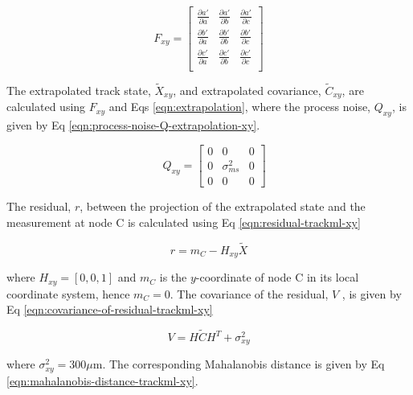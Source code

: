 \begin{equation}
F_{xy} = \begin{bmatrix} 
        \frac{\partial a'}{\partial a} & \frac{\partial a'}{\partial b} & \frac{\partial a'}{\partial c} \\ 
        
        \frac{\partial b'}{\partial a} & \frac{\partial b'}{\partial b} & \frac{\partial b'}{\partial c} \\
        
        \frac{\partial c'}{\partial a} & \frac{\partial c'}{\partial b} & \frac{\partial c'}{\partial c} \\
        \end{bmatrix} 
\label{eqn:transition-jacobian-F-kf-extrapolation-xy}
\end{equation}


The extrapolated track state, $\tilde{X}_{xy}$, and extrapolated covariance, $\tilde{C}_{xy}$, are calculated using $F_{xy}$ and Eqs \eqref{eqn:extrapolation}, where the process noise, $Q_{xy}$, is given by Eq \eqref{eqn:process-noise-Q-extrapolation-xy}.

\begin{equation}
\quad Q_{xy} = \begin{bmatrix} 
                0 & 0 & 0 \\ 
                0 & \sigma_{ms}^2 & 0 \\
                0 & 0 & 0 \end{bmatrix} 
\label{eqn:process-noise-Q-extrapolation-xy}
\end{equation}

The residual, $r$, between the projection of the extrapolated state and the measurement at node C is calculated using Eq \eqref{eqn:residual-trackml-xy}

\begin{equation}
r = m_C - H_{xy} \tilde{X}
\label{eqn:residual-trackml-xy}
\end{equation}

where $H_{xy} = [0, 0, 1]$ and $m_C$ is the $y$-coordinate of node C in its local coordinate system, hence $m_C = 0$. The covariance of the residual, $V$ , is given by Eq \eqref{eqn:covariance-of-residual-trackml-xy}

\begin{equation}
{V} = H \widetilde{C} H^{T} + \sigma_{xy}^{2}
\label{eqn:covariance-of-residual-trackml-xy}
\end{equation}

where $\sigma_{xy}^{2} = 300\mu$m. The corresponding Mahalanobis distance is given by Eq \eqref{eqn:mahalanobis-distance-trackml-xy}.

